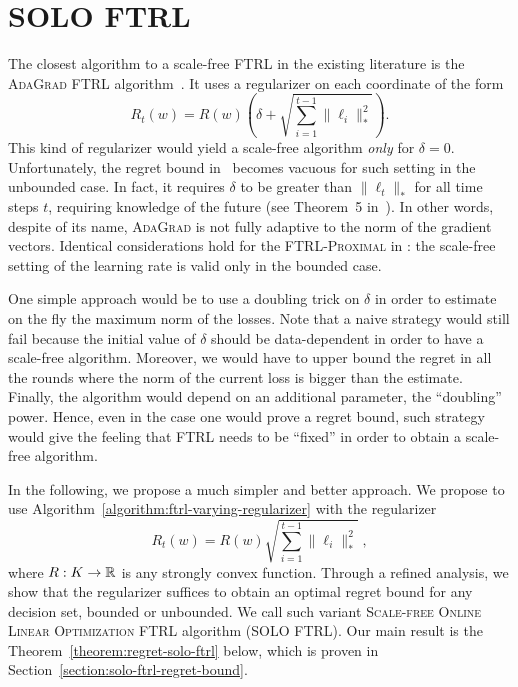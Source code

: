 \section{\textsc{SOLO FTRL}}
\label{section:solo-ftrl}

The closest algorithm to a scale-free \textsc{FTRL} in the existing literature
is the \textsc{AdaGrad FTRL} algorithm~\cite{Duchi-Hazan-Singer-2011}. It uses a
regularizer on each coordinate of the form
\begin{equation*}
R_t(w) = R(w) \left(\delta + \sqrt{\sum_{i=1}^{t-1} \|\ell_i\|_*^2} \right).
\end{equation*}
This kind of regularizer would yield a scale-free algorithm \emph{only} for
$\delta=0$.  Unfortunately, the regret bound in~\cite{Duchi-Hazan-Singer-2011}
becomes vacuous for such setting in the unbounded case. In fact, it requires
$\delta$ to be greater than $\|\ell_t\|_*$ for all time steps $t$, requiring
knowledge of the future (see Theorem~5 in~\cite{Duchi-Hazan-Singer-2011}). In
other words, despite of its name, \textsc{AdaGrad} is not fully adaptive to the
norm of the gradient vectors. Identical considerations hold for the
\textsc{FTRL-Proximal} in \cite{McMahan-Streeter-2010,McMahan-2014}: the
scale-free setting of the learning rate is valid only in the bounded case.

One simple approach would be to use a doubling trick on $\delta$ in order to
estimate on the fly the maximum norm of the losses. Note that a naive strategy
would still fail because the initial value of $\delta$ should be data-dependent
in order to have a scale-free algorithm. Moreover, we would have to upper bound
the regret in all the rounds where the norm of the current loss is bigger than
the estimate. Finally, the algorithm would depend on an additional parameter,
the ``doubling'' power. Hence, even in the case one would prove a regret bound,
such strategy would give the feeling that \textsc{FTRL} needs to be ``fixed''
in order to obtain a scale-free algorithm.

In the following, we propose a much simpler and better approach.  We propose to
use Algorithm~\ref{algorithm:ftrl-varying-regularizer} with the regularizer
\begin{equation*}
\label{equation:solo-ftrl-regularizer}
R_t(w) = R(w) \sqrt{\sum_{i=1}^{t-1} \|\ell_i\|_*^2} \; ,
\end{equation*}
where $R:K \to \mathbb{R}$ is any strongly convex function. Through a refined analysis,
we show that the regularizer suffices to obtain an optimal regret bound for any
decision set, bounded or unbounded.  We call such variant \textsc{Scale-free
Online Linear Optimization FTRL} algorithm (\textsc{SOLO FTRL}).  Our main
result is the Theorem~\ref{theorem:regret-solo-ftrl} below, which is proven in
Section~\ref{section:solo-ftrl-regret-bound}.

